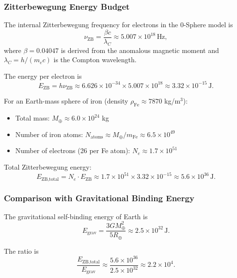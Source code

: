\documentclass[%
 reprint,
 amsmath,amssymb,
 aps,
 prb,
]{revtex4-2}
\numberwithin{equation}{section}
\begin{document}
\subsubsection{Zitterbewegung Energy Budget}

The internal Zitterbewegung frequency for electrons in the 0-Sphere model is \cite{Hanamura2024spin}
\begin{equation}
\nu_{\text{ZB}} = \frac{\beta c}{\lambda_C} \approx 5.007 \times 10^{18}\,\text{Hz},
\end{equation}
where $\beta = 0.04047$ is derived from the anomalous magnetic moment and $\lambda_C = h/(m_e c)$ is the Compton wavelength.

The energy per electron is
\begin{equation}
E_{\text{ZB}} = h\nu_{\text{ZB}} \approx 6.626 \times 10^{-34} \times 5.007 \times 10^{18} \approx 3.32 \times 10^{-15}\,\text{J}.
\end{equation}

For an Earth-mass sphere of iron (density $\rho_{\text{Fe}} \approx 7870$ kg/m$^3$):
\begin{itemize}
\item Total mass: $M_{\oplus} \approx 6.0 \times 10^{24}$ kg
\item Number of iron atoms: $N_{\text{atoms}} \approx M_{\oplus}/m_{\text{Fe}} \approx 6.5 \times 10^{49}$
\item Number of electrons (26 per Fe atom): $N_e \approx 1.7 \times 10^{51}$
\end{itemize}

Total Zitterbewegung energy:
\begin{equation}
E_{\text{ZB,total}} = N_e \cdot E_{\text{ZB}} \approx 1.7 \times 10^{51} \times 3.32 \times 10^{-15} \approx 5.6 \times 10^{36}\,\text{J}.
\end{equation}

\subsubsection{Comparison with Gravitational Binding Energy}

The gravitational self-binding energy of Earth is
\begin{equation}
E_{\text{grav}} = \frac{3GM_{\oplus}^2}{5R_{\oplus}} \approx 2.5 \times 10^{32}\,\text{J}.
\end{equation}

The ratio is
\begin{equation}
\frac{E_{\text{ZB,total}}}{E_{\text{grav}}} \approx \frac{5.6 \times 10^{36}}{2.5 \times 10^{32}} \approx 2.2 \times 10^4.
\end{equation}
\end{document}

